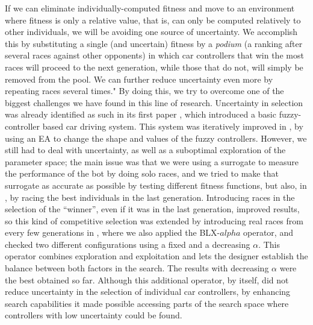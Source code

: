 \documentclass[10pt,journal,compsoc]{IEEEtran}
\begin{document}
If we can eliminate individually-computed fitness and move to an
environment where fitness is only a relative value, that is, can only
be computed relatively to other individuals, we will be avoiding one
source of uncertainty. We accomplish this by substituting a single
(and uncertain) fitness by a {\em podium} (a ranking after several races
against other opponents) in which car controllers that win the most
races will proceed to the next generation, while those that do not,
will simply be removed from the pool. We can further reduce
uncertainty even more by repeating races several times."  By doing
this, we try to overcome one of the biggest challenges we have found
in this line of research. Uncertainty in selection was already
identified as such in its first paper \cite{salem_evo17}, which
introduced a basic fuzzy-controller based car driving system. This
system was iteratively improved in \cite{salem_evo18,salem_cig2018},
by using an EA to change the shape and values of the fuzzy
controllers. However, we still had to deal with uncertainty, as well
as a suboptimal exploration of the parameter space; the main issue was
that we were using a surrogate to measure the performance of the bot
by doing solo races, and we tried to make that surrogate as accurate
as possible by testing different fitness functions, but also, in
\cite{salem_cig2018}, by racing the best individuals in the last
generation. Introducing races in the selection of the ``winner'', even
if it was in the last generation, improved results, so this kind of
competitive selection was extended by introducing real races from
every few generations in \cite{DBLP:conf/cig/SalemMG19}, where we also
applied the BLX-$alpha$ operator, and checked two different
configurations using a fixed and a decreasing $\alpha$. This operator
combines exploration and exploitation and lets the designer establish
the balance between both factors in the search. The results with
decreasing $\alpha$ were the best obtained so far. Although this
additional operator, by itself, did not reduce uncertainty in the
selection of individual car controllers, by enhancing search
capabilities it made possible accessing parts of the search space
where controllers with low uncertainty could be found.
\end{document}
